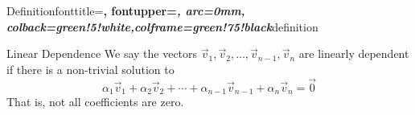 \documentclass[preview]{standalone}
\begin{document}


%
  {Definition}{fonttitle=\bfseries\upshape, fontupper=\slshape,
     arc=0mm, colback=green!5!white,colframe=green!75!black}{definition}

\begin{defn*}{Linear Dependence}
We say the vectors
\(\vec{v}_{1}, \vec{v}_{2},  \dots ,\vec{v}_{n - 1},\vec{v}_{n}\) are
linearly dependent if there is a non-trivial solution to
\[
\alpha_{1}\vec{v}_{1}  +  \alpha_{2}\vec{v}_{2}  +  \dotsb  +  \alpha_{n - 1}\vec{v}_{n - 1}  +  \alpha_{n}\vec{v}_{n} = \vec{0}
\]
That is, not all coefficients are zero.

\end{defn*}
\end{document}
